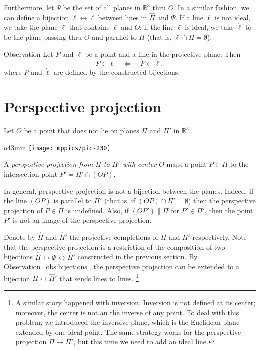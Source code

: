 Furthermore, let $\Psi$ be the set of all planes in $\mathbb{R}^3$ thru $O$.
In a similar fashion, we can define a bijection $\ell\leftrightarrow \dot \ell$ between lines in $\hat \Pi$ and $\Psi$.
If a line $\ell$ is not ideal, we take the plane $\dot \ell$ that contains $\ell$ and $O$;
if the line $\ell$ is ideal, we take $\dot \ell$ to be the plane passing thru $O$ and parallel to $\Pi$ (that is, $\dot\ell\cap\Pi=\emptyset$).

\begin{thm}{Observation}\label{obs:bijections}
Let $P$ and $\ell$ be a point and a line in the projective plane.
Then 
\[P\in \ell \quad\iff\quad \dot P\subset \dot \ell,\]
where $\dot P$ and $\dot \ell$ are defined by the constructed bijections.
\end{thm}

\section{Perspective projection}
\label{sec:perspective-projection}

Let $O$ be a point that does not lie on planes $\Pi$ and $\Pi'$ in $\mathbb{R}^3$.

\begin{wrapfigure}{o}{43mm}
\centering
\vskip-4mm
\texttt{[image: mppics/pic-230]}
\end{wrapfigure}

A \emph{perspective projection from $\Pi$ to $\Pi'$ with center $O$} maps a point $P\in \Pi$
to the intersection point $P'=\Pi'\cap (OP)$.

In general, perspective projection is not a bijection between the planes.
Indeed, if the line $(OP)$ is parallel to $\Pi'$ 
(that is, if $(OP)\cap\Pi'=\emptyset$)
then the perspective projection of $P\in \Pi$ is undefined.
Also, if $(OP')\parallel \Pi$ 
for $P'\in \Pi'$,
then the point $P'$ is not an image of the perspective projection.

Denote by $\hat \Pi$ and $\hat \Pi'$ the projective completions of $\Pi$ and $\Pi'$ respectively. 
Note that the perspective projection is a restriction of the composition of two bijections $\hat \Pi\leftrightarrow\Phi \leftrightarrow\hat \Pi'$ constructed in the previous section.
By Observation~\ref{obs:bijections}, the perspective projection can be extended to a bijection $\hat \Pi\leftrightarrow\hat \Pi'$ that sends lines to lines.%
\footnote{A similar story happened with inversion.
Inversion is not defined at its center;
moreover, the center is not an the inverse of any point.
To deal with this problem, we introduced the inversive plane, 
which is the Euclidean plane extended by one ideal point.
The same strategy works for the perspective projection $\Pi\to\Pi'$, but this time we need to add an ideal line.}

